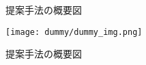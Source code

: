 \begin{figure}[htbp]
    \centering
    
    \caption{提案手法の概要図}
    \label{fig:proposed_method}
\end{figure}


\begin{figure}[htbp]
    \centering
    \texttt{[image: dummy/dummy\_img.png]}
    \caption{提案手法の概要図}
    \label{fig:proposed_method}
\end{figure}

